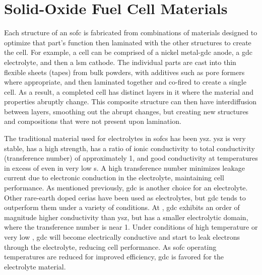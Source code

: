 \section{Solid-Oxide Fuel Cell Materials}
    Each structure of an \gls{sofc} is fabricated from combinations of materials designed to optimize that part's function then laminated with the other structures to create the cell.
    For example, a cell can be comprised of a nickel metal-\gls{gdc} anode, a \gls{gdc} electrolyte, and then a \gls{lsm} cathode.\cite{Liu2002,Haile2003}
    The individual parts are cast into thin flexible sheets (tapes) from bulk powders, with additives such as pore formers where appropriate, and then laminated together and co-fired to create a single cell.
    As a result, a completed cell has distinct layers in it where the material and properties abruptly change.
    This composite structure can then have interdiffusion between layers, smoothing out the abrupt changes, but creating new structures and compositions that were not present upon lamination.\cite{Yokokawa2008}

    The traditional material used for electrolytes in \glspl{sofc} has been \gls{ysz}.
    \Gls{ysz} is very stable, has a high strength, has a ratio of ionic conductivity to total conductivity (transference number) of approximately 1, and good conductivity at temperatures in excess of  even in very low s.
    A high transference number minimizes leakage current due to electronic conduction in the electrolyte, maintaining cell performance.
    As mentioned previously, \gls{gdc} is another choice for an electrolyte.
    Other rare-earth doped cerias have been used as electrolytes, but \gls{gdc} tends to outperform them under a variety of conditions.\cite{Andersson2006,Balazs1995,Zha2003}
    At , \gls{gdc} exhibits an order of magnitude higher conductivity than \gls{ysz}, but has a smaller electrolytic domain, where the transference number is near 1.\cite{Inaba1996}
    Under conditions of high temperature or very low , \gls{gdc} will become electrically conductive and start to leak electrons through the electrolyte, reducing cell performance.
    As \gls{sofc} operating temperatures are reduced for improved efficiency, \gls{gdc} is favored for the electrolyte material.

